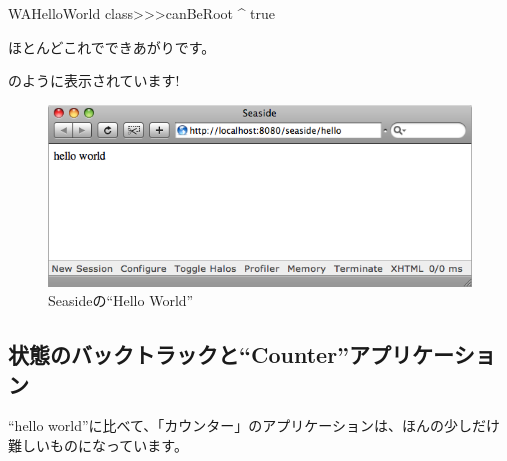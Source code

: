 \documentclass[a4paper,10pt,twoside]{book}
\begin{document}
{{

\begin{code}{}
WAHelloWorld class>>>canBeRoot
	^ true
\end{code}

\noindent
ほとんどこれでできあがりです。

のように表示されています!

\begin{figure}[htb]
\begin{center}
\includegraphics[width=\textwidth]{WAHelloWorld}
\caption{Seasideの``Hello World''}
\end{center}
\end{figure}

\subsection{状態のバックトラックと``Counter''アプリケーション}

``hello world''に比べて、「カウンター」のアプリケーションは、ほんの少しだけ難しいものになっています。

}}
\end{document}
